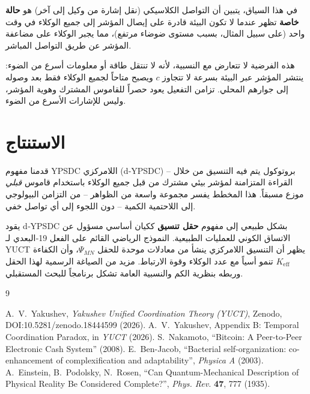 \documentclass[11pt,a4paper]{article}
\begin{document}
	في هذا السياق، يتبين أن التواصل الكلاسيكي (نقل إشارة من وكيل إلى آخر) هو \textbf{حالة خاصة} تظهر عندما لا تكون البيئة قادرة على إيصال المؤشر إلى جميع الوكلاء في وقت واحد (على سبيل المثال، بسبب مستوى ضوضاء مرتفع)، مما يجبر الوكلاء على مضاعفة المؤشر عن طريق التواصل المباشر.
	
	هذه الفرضية لا تتعارض مع النسبية، لأنه لا تنتقل طاقة أو معلومات أسرع من الضوء: ينتشر المؤشر عبر البيئة بسرعة لا تتجاوز \(c\) ويصبح متاحاً لجميع الوكلاء فقط بعد وصوله إلى جوارهم المحلي. تزامن التفعيل يعود حصراً للقاموس المشترك وهوية المؤشر، وليس للإشارات الأسرع من الضوء.
	
	\section{الاستنتاج}
	
	قدمنا مفهوم YPSDC اللامركزي (d‑YPSDC) – بروتوكول يتم فيه التنسيق من خلال القراءة المتزامنة لمؤشر بيئي مشترك من قبل جميع الوكلاء باستخدام قاموس \emph{قبلي} موزع مسبقاً. هذا المخطط يفسر مجموعة واسعة من الظواهر – من التزامن البيولوجي إلى اللاحتمية الكمية – دون اللجوء إلى أي تواصل خفي.
	
	يقود d‑YPSDC بشكل طبيعي إلى مفهوم \textbf{حقل تنسيق} ككيان أساسي مسؤول عن الاتساق الكوني للعمليات الطبيعية. النموذج الرياضي القائم على الفعل 19‑البعدي لـ YUCT يظهر أن التنسيق اللامركزي ينشأ من معادلات موحدة للحقل \(\Psi_{MN}\)، وأن الكفاءة \(K_{\mathrm{eff}}\) تنمو أسياً مع عدد الوكلاء وقوة الارتباط. مزيد من الصياغة الرسمية لهذا الحقل وربطه بنظرية الكم والنسبية العامة تشكل برنامجاً للبحث المستقبلي.
	
	\begin{thebibliography}{9}
		\begin{otherlanguage}{english}
			 A.~V.~Yakushev, \emph{Yakushev Unified Coordination Theory (YUCT)}, Zenodo, DOI:10.5281/zenodo.18444599 (2026).
			 A.~V.~Yakushev, Appendix B: Temporal Coordination Paradox, in \emph{YUCT} (2026).
			 S.~Nakamoto, ``Bitcoin: A Peer-to-Peer Electronic Cash System'' (2008).
			 E.~Ben-Jacob, ``Bacterial self-organization: co-enhancement of complexification and adaptability'', \emph{Physica A} (2003).
			 A.~Einstein, B.~Podolsky, N.~Rosen, ``Can Quantum-Mechanical Description of Physical Reality Be Considered Complete?'', \emph{Phys. Rev.} \textbf{47}, 777 (1935).
		\end{otherlanguage}
	\end{thebibliography}
	
\end{document}
